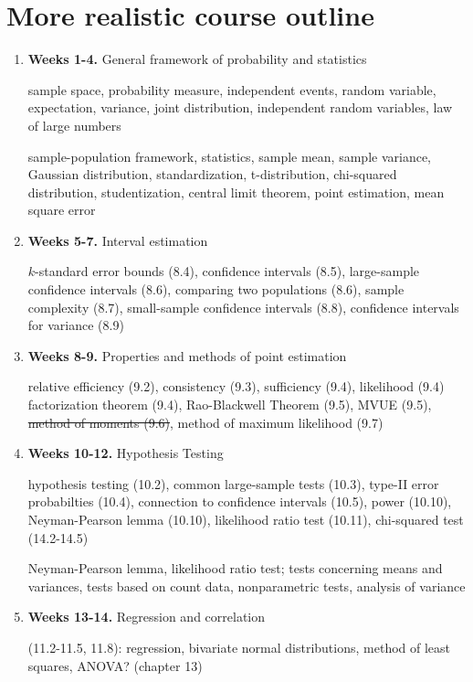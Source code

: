 \documentclass[10pt]{article}
\theoremstyle{definition}
\newcommand{\1}[1]{\textbf{1}_{\left[#1\right]}} %
\begin{document}
\section*{More realistic course outline}
\begin{enumerate}
  \item \textbf{Weeks 1-4.} General framework of probability and statistics

  sample space, probability measure, independent events, random variable,
  expectation, variance, joint distribution, independent random variables, law
  of large numbers

  sample-population framework, statistics, {sample mean}, {sample variance},
  Gaussian distribution, standardization, {t-distribution}, {chi-squared
    distribution}, studentization, central limit theorem, {point estimation},
  mean square error
  
  \item \textbf{Weeks 5-7.} Interval estimation

  $k$-standard error bounds (8.4), confidence intervals (8.5),
  {large-sample confidence intervals} (8.6), {comparing two
    populations} (8.6), sample complexity (8.7), small-sample confidence
  intervals (8.8), {confidence intervals for variance} (8.9)

  \item \textbf{Weeks 8-9.} Properties and methods of point estimation

  relative efficiency (9.2), consistency (9.3), sufficiency (9.4), likelihood
  (9.4) factorization theorem (9.4),
  Rao-Blackwell Theorem (9.5), MVUE (9.5), \sout{method of moments (9.6)}, method of
  maximum likelihood (9.7)

  \item \textbf{Weeks 10-12.} Hypothesis Testing

  hypothesis testing (10.2), common large-sample tests (10.3), type-II error
  probabilties (10.4), connection to confidence intervals (10.5), power
  (10.10), Neyman-Pearson lemma (10.10), likelihood ratio test (10.11),
  chi-squared test (14.2-14.5)

  Neyman-Pearson lemma, likelihood ratio test; tests concerning means and
  variances, tests based on count data, nonparametric tests, analysis of variance

  \item \textbf{Weeks 13-14.} Regression and correlation

  (11.2-11.5, 11.8): regression, bivariate normal distributions, method of least
  squares, ANOVA? (chapter 13)
\end{enumerate}
\end{document}
